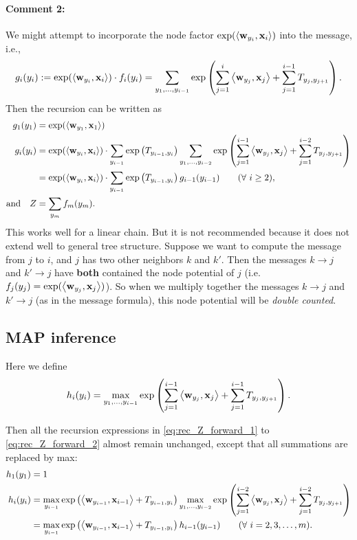 \documentclass[11pt]{report}
\begin{document}
\paragraph{Comment 2:}
We might attempt to incorporate the node factor $\exp(\left\langle \mathbf{\boldsymbol{w}}_{y_i},\mathbf{\boldsymbol{x}}_i \right\rangle)$ into the message, i.e.,
\begin{align}
	g_i(y_i) := \exp(\left\langle \mathbf{\boldsymbol{w}}_{y_i},\mathbf{\boldsymbol{x}}_i \right\rangle) \cdot f_i(y_i) = \sum_{y_1, \ldots, y_{i-1}} \exp \left(\sum_{j=1}^{i} \left\langle \mathbf{\boldsymbol{w}}_{y_j},\mathbf{\boldsymbol{x}}_j \right\rangle + \sum_{j=1}^{i-1} T_{y_j, y_{j+1}}\right).
\end{align}
Then the recursion can be written as
\begin{align}
	g_1(y_1) &= \exp(\left\langle \mathbf{\boldsymbol{w}}_{y_1},\mathbf{\boldsymbol{x}}_1 \right\rangle) \\
	g_i(y_i) &= \exp(\left\langle \mathbf{\boldsymbol{w}}_{y_i},\mathbf{\boldsymbol{x}}_i \right\rangle) \cdot \sum_{y_{i-1}} \exp \left(T_{y_{i-1}, y_i}\right)
	\sum_{y_1, \ldots, y_{i-2}} \exp \left(\sum_{j=1}^{i-1} \left\langle \mathbf{\boldsymbol{w}}_{y_j},\mathbf{\boldsymbol{x}}_j \right\rangle + \sum_{j=1}^{i-2} T_{y_j, y_{j+1}}\right) \\
	&= \exp(\left\langle \mathbf{\boldsymbol{w}}_{y_i},\mathbf{\boldsymbol{x}}_i \right\rangle) \cdot \sum_{y_{i-1}} \exp \left(T_{y_{i-1}, y_i}\right)  g_{i-1}(y_{i-1})  \qquad (\forall\ i \ge 2), \\
	\text{and} \quad Z &= \sum_{y_m} f_m(y_m).
\end{align}
This works well for a linear chain.
But it is not recommended because it does not extend well to general tree structure.
Suppose we want to compute the message from $j$ to $i$, and $j$ has two other neighbors $k$ and $k'$.
Then the messages $k \to j$ and $k' \to j$ have \textbf{both} contained the node potential of $j$ (i.e. $f_j(y_j) = \exp (\left\langle \mathbf{\boldsymbol{w}}_{y_j},\mathbf{\boldsymbol{x}}_j \right\rangle)$).
So when we multiply together the messages $k \to j$ and $k' \to j$ (as in the message formula),
this node potential will be \emph{double counted}.

\subsection{MAP inference}
Here we define
\begin{align}
	h_i(y_i) = \max_{y_1, \ldots, y_{i-1}} \exp \left(\sum_{j=1}^{i-1} \left\langle \mathbf{\boldsymbol{w}}_{y_j},\mathbf{\boldsymbol{x}}_j \right\rangle + \sum_{j=1}^{i-1} T_{y_j, y_{j+1}}\right).
\end{align}

Then all the recursion expressions in \eqref{eq:rec_Z_forward_1}	to \eqref{eq:rec_Z_forward_2} almost remain unchanged,
except that all summations are replaced by max:
\begin{align}
	\label{eq:rec_MAP_forward_1}
	h_1(y_1) &= 1 \\
	h_i(y_i) &= \max_{y_{i-1}} \exp \left(\left\langle \mathbf{\boldsymbol{w}}_{y_{i-1}},\mathbf{\boldsymbol{x}}_{i-1} \right\rangle + T_{y_{i-1}, y_i}\right)
	\max_{y_1, \ldots, y_{i-2}} \exp \left(\sum_{j=1}^{i-2} \left\langle \mathbf{\boldsymbol{w}}_{y_j},\mathbf{\boldsymbol{x}}_j \right\rangle + \sum_{j=1}^{i-2} T_{y_j, y_{j+1}}\right) \\
	\label{eq:rec_MAP_forward_2}	
	&= \max_{y_{i-1}} \exp \left(\left\langle \mathbf{\boldsymbol{w}}_{y_{i-1}},\mathbf{\boldsymbol{x}}_{i-1} \right\rangle + T_{y_{i-1}, y_i}\right)  h_{i-1}(y_{i-1})  \qquad (\forall\ i = 2, 3, \ldots, m).
\end{align}
\end{document}
